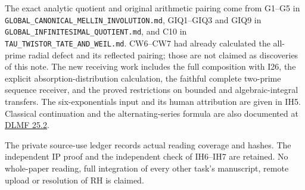 The exact analytic quotient and original arithmetic pairing come from
G1--G5 in \nolinkurl{GLOBAL_CANONICAL_MELLIN_INVOLUTION.md}, GIQ1--GIQ3
and GIQ9 in \nolinkurl{GLOBAL_INFINITESIMAL_QUOTIENT.md}, and C10 in
\nolinkurl{TAU_TWISTOR_TATE_AND_WEIL.md}. CW6--CW7 had already
calculated the all-prime radial defect and its reflected pairing; those
are not claimed as discoveries of this note. The new receiving work
includes the full composition with I26, the explicit
absorption-distribution calculation, the faithful complete two-prime
sequence receiver, and the proved restrictions on bounded and
algebraic-integral transfers. The six-exponentials input and its human
attribution are given in IH5. Classical continuation and the
alternating-series formula are also documented at
\href{https://dlmf.nist.gov/25.2}{DLMF 25.2}.

The private source-use ledger records actual reading coverage and
hashes. The independent IP proof and the independent check of IH6--IH7
are retained. No whole-paper reading, full integration of every other
task's manuscript, remote upload or resolution of RH is claimed.
